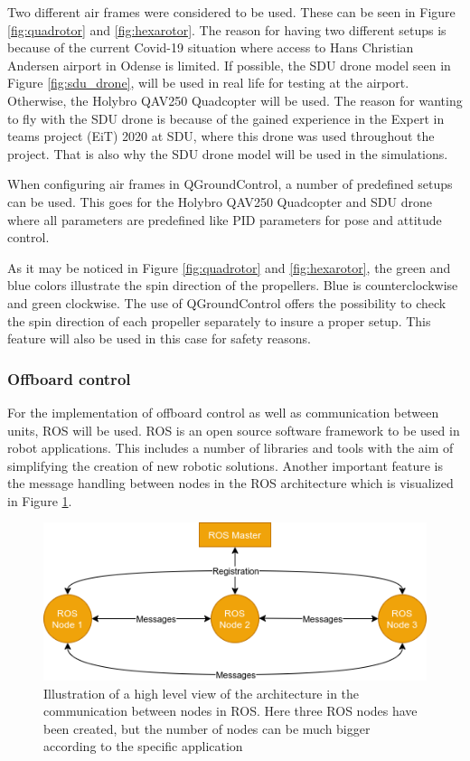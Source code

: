 \documentclass[../Head/report.tex]{subfiles}
\begin{document}
Two different air frames were considered to be used. These can be seen in Figure \ref{fig:quadrotor} and \ref{fig:hexarotor}. The reason for having two different setups is because of the current Covid-19 situation where access to Hans Christian Andersen airport in Odense is limited. If possible, the SDU drone model seen in Figure \ref{fig:sdu_drone}, will be used in real life for testing at the airport. Otherwise, the Holybro QAV250 Quadcopter will be used. The reason for wanting to fly with the SDU drone is because of the gained experience in the Expert in teams project (EiT) 2020 at SDU, where this drone was used throughout the project. That is also why the SDU drone model will be used in the simulations. 

When configuring air frames in QGroundControl, a number of predefined setups can be used. This goes for the Holybro QAV250 Quadcopter and SDU drone where all parameters are predefined like PID parameters for pose and attitude control.

As it may be noticed in Figure \ref{fig:quadrotor} and \ref{fig:hexarotor}, the green and blue colors illustrate the spin direction of the propellers. Blue is counterclockwise and green clockwise. The use of QGroundControl offers the possibility to check the spin direction of each propeller separately to insure a proper setup. This feature will also be used in this case for safety reasons.  

 
\subsubsection{Offboard control}
\label{sec:offboard_control}


For the implementation of offboard control as well as communication between units, ROS will be used. ROS is an open source software framework to be used in robot applications. This includes a number of libraries and tools with the aim of simplifying the creation of new robotic solutions. Another important feature is the message handling between nodes in the ROS architecture which is visualized in Figure \ref{fig:ros}.

\begin{figure}[H]
    \centering
    \includegraphics[width=0.75\linewidth]{../Figures/ros.png}
    \caption{Illustration of a high level view of the architecture in the communication between nodes in ROS. Here three ROS nodes have been created, but the number of nodes can be much bigger according to the specific application}
    \label{fig:ros}
\end{figure}
\end{document}
